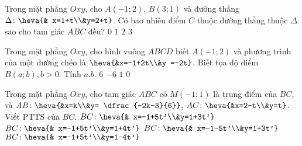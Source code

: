 \begin{ex}%
	Trong mặt phẳng $Oxy$, cho $A(-1;2)$, $B(3;1)$ và đường thẳng $\Delta\colon \heva{& x=1+t\\&y=2+t}$. Có bao nhiêu điểm $C$ thuộc đường thẳng thuộc $\Delta$ sao cho tam giác $ABC$ đều?
	\choice
	{\True$0$}
	{$1$}
	{$2$}
	{$3$}
\end{ex}

\begin{ex}%
	Trong mặt phẳng $Oxy$, cho hình vuông $ABCD$ biết $A(-1;2)$ và phương trình của một đường chéo là $\heva{&x=-1+2t\\&y =-2t}$. Biết tọa độ điểm $B(a;b), b>0$. Tính $a.b$.
	\choice
	{$6$}
	{\True $-6$}
	{$1$}
	{ $0$}
\end{ex}
\begin{ex}%
	Trong mặt phẳng $Oxy$, cho tam giác $ABC$ có $M(-1;1)$ là trung điểm  của $BC$, và $AB\colon \heva{&x=k\\&y= \dfrac{-2k-3}{6}}$, $AC \colon \heva{&x=2-t\\&y=t}$. Viết PTTS của $BC$.
	\choice
	{\True $BC\colon \heva{& x=-1+5t'\\&y=1+3t'}$}
	{$BC\colon \heva{& x=-1+5t'\\&y=1+4t'}$}
	{$BC\colon \heva{& x=-1-5t'\\&y=1+3t'}$}
	{$BC\colon \heva{& x=-1+5t'\\&y=1-4t'}$}
\end{ex}

